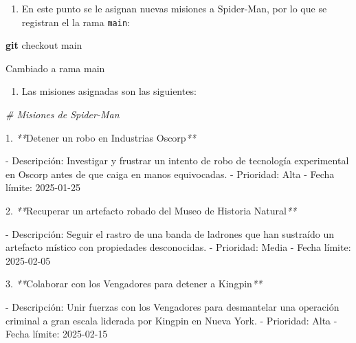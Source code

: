 \documentclass[
]{book}
\newenvironment{Shaded}{\begin{snugshade}}{\end{snugshade}}
\newcommand{\CommentTok}[1]{\textcolor[rgb]{0.56,0.35,0.01}{\textit{#1}}}
\newcommand{\ExtensionTok}[1]{#1}
\newcommand{\FunctionTok}[1]{\textcolor[rgb]{0.13,0.29,0.53}{\textbf{#1}}}
\newcommand{\NormalTok}[1]{#1}
\newcommand{\PreprocessorTok}[1]{\textcolor[rgb]{0.56,0.35,0.01}{\textit{#1}}}
\newcommand{\StringTok}[1]{\textcolor[rgb]{0.31,0.60,0.02}{#1}}
\providecommand{\tightlist}{%
  \setlength{\itemsep}{0pt}\setlength{\parskip}{0pt}}
\begin{document}
\begin{enumerate}
\def\labelenumi{\arabic{enumi}.}
\setcounter{enumi}{4}
\tightlist
\item
  En este punto se le asignan nuevas misiones a Spider-Man, por lo que se registran el la rama \texttt{main}:
\end{enumerate}

\begin{Shaded}
\begin{Highlighting}[]
\FunctionTok{git}\NormalTok{ checkout main}
\end{Highlighting}
\end{Shaded}

\begin{Shaded}
\begin{Highlighting}[]
\ExtensionTok{Cambiado}\NormalTok{ a rama }\StringTok{\textquotesingle{}main\textquotesingle{}}
\end{Highlighting}
\end{Shaded}

\begin{enumerate}
\def\labelenumi{\arabic{enumi}.}
\setcounter{enumi}{5}
\tightlist
\item
  Las misiones asignadas son las siguientes:
\end{enumerate}

\begin{Shaded}
\begin{Highlighting}[]
\CommentTok{\# Misiones de Spider{-}Man}

\ExtensionTok{1.} \PreprocessorTok{**}\NormalTok{Detener un robo en Industrias Oscorp}\PreprocessorTok{**}
   
   \ExtensionTok{{-}}\NormalTok{ Descripción: Investigar y frustrar un intento de robo de tecnología experimental en Oscorp antes de que caiga en manos equivocadas.}
   \ExtensionTok{{-}}\NormalTok{ Prioridad: Alta}
   \ExtensionTok{{-}}\NormalTok{ Fecha límite: 2025{-}01{-}25}

\ExtensionTok{2.} \PreprocessorTok{**}\NormalTok{Recuperar un artefacto robado del Museo de Historia Natural}\PreprocessorTok{**}
   
   \ExtensionTok{{-}}\NormalTok{ Descripción: Seguir el rastro de una banda de ladrones que han sustraído un artefacto místico con propiedades desconocidas.}
   \ExtensionTok{{-}}\NormalTok{ Prioridad: Media}
   \ExtensionTok{{-}}\NormalTok{ Fecha límite: 2025{-}02{-}05}

\ExtensionTok{3.} \PreprocessorTok{**}\NormalTok{Colaborar con los Vengadores para detener a Kingpin}\PreprocessorTok{**}
   
   \ExtensionTok{{-}}\NormalTok{ Descripción: Unir fuerzas con los Vengadores para desmantelar una operación criminal a gran escala liderada por Kingpin en Nueva York.}
   \ExtensionTok{{-}}\NormalTok{ Prioridad: Alta}
   \ExtensionTok{{-}}\NormalTok{ Fecha límite: 2025{-}02{-}15}
\end{Highlighting}
\end{Shaded}
\end{document}
